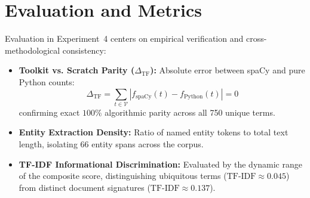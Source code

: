 \section{Evaluation and Metrics}
Evaluation in Experiment~4 centers on empirical verification and cross-methodological consistency:
\begin{itemize}
    \item \textbf{Toolkit vs. Scratch Parity ($\Delta_{\text{TF}}$):} Absolute error between spaCy and pure Python counts:
    \begin{equation}
        \Delta_{\text{TF}} = \sum_{t \in \mathcal{V}} |f_{\text{spaCy}}(t) - f_{\text{Python}}(t)| = 0
    \end{equation}
    confirming exact $100\%$ algorithmic parity across all 750 unique terms.
    \item \textbf{Entity Extraction Density:} Ratio of named entity tokens to total text length, isolating 66 entity spans across the corpus.
    \item \textbf{TF-IDF Informational Discrimination:} Evaluated by the dynamic range of the composite score, distinguishing ubiquitous terms ($\text{TF-IDF} \approx 0.045$) from distinct document signatures ($\text{TF-IDF} \approx 0.137$).
\end{itemize}

